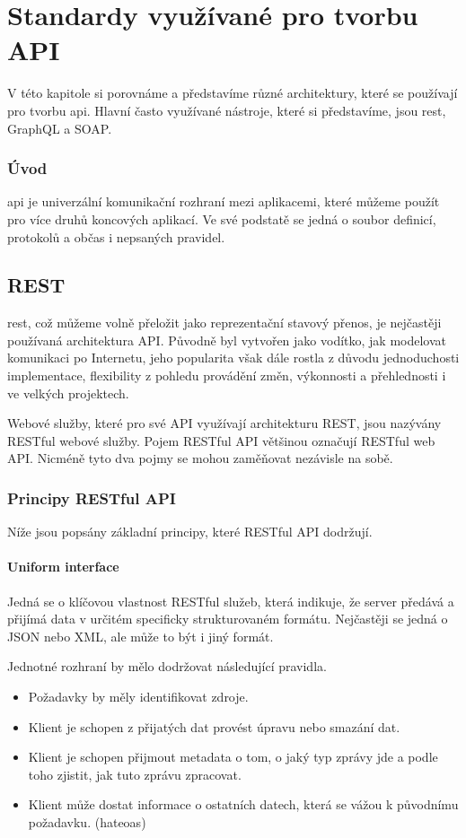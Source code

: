\chapter{Standardy využívané pro tvorbu API}\label{chap:standards}
V této kapitole si porovnáme a představíme různé architektury, které se používají pro tvorbu \gls{api}.
Hlavní často využívané nástroje, které si představíme, jsou \gls{rest}, GraphQL a SOAP.

\subsection*{Úvod}
\gls{api} je univerzální komunikační rozhraní mezi aplikacemi, které můžeme použít pro více druhů koncových aplikací. Ve své podstatě se jedná o soubor definicí, protokolů a občas i nepsaných pravidel.


\section{REST}\label{sec:rest}
\gls{rest}, což můžeme volně přeložit jako reprezentační stavový přenos, je nejčastěji používaná architektura API. Původně byl vytvořen jako vodítko, jak modelovat komunikaci po Internetu, jeho popularita však dále rostla z důvodu jednoduchosti implementace, flexibility z pohledu provádění změn, výkonnosti a přehlednosti i ve velkých projektech.

Webové služby, které pro své API využívají architekturu REST, jsou nazývány RESTful webové služby. Pojem RESTful API většinou označují RESTful web API. Nicméně tyto dva pojmy se mohou zaměňovat nezávisle na sobě. \cite[]{devToApiStyles}


\subsection{Principy RESTful API}\label{sec:rest:principles}

Níže jsou popsány základní principy, které RESTful API dodržují.\cite{restfulApi}\cite[]{phd:restful_api}

\subsubsection*{Uniform interface}
Jedná se o klíčovou vlastnost RESTful služeb, která indikuje, že server předává a přijímá data v určitém specificky strukturovaném formátu. Nejčastěji se jedná o JSON nebo XML, ale může to být i jiný formát.

Jednotné rozhraní by mělo dodržovat následující pravidla.\
\begin{itemize}
    \item Požadavky by měly identifikovat zdroje.
    \item Klient je schopen z přijatých dat provést úpravu nebo smazání dat.
    \item Klient je schopen přijmout metadata o tom, o jaký typ zprávy jde a podle toho zjistit, jak tuto zprávu zpracovat.
    \item Klient může dostat informace o ostatních datech, která se vážou k původnímu požadavku. (\gls{hateoas})
\end{itemize}

